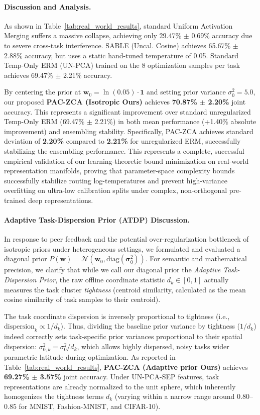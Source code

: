 \paragraph{Discussion and Analysis.} As shown in Table~\ref{tab:real_world_results}, standard Uniform Activation Merging suffers a massive collapse, achieving only 29.47\% $\pm$ 0.69\% accuracy due to severe cross-task interference. SABLE (Uncal. Cosine) achieves 65.67\% $\pm$ 2.88\% accuracy, but uses a static hand-tuned temperature of 0.05. Standard Temp-Only ERM (UN-PCA) trained on the 8 optimization samples per task achieves 69.47\% $\pm$ 2.21\% accuracy. 

By centering the prior at $\mathbf{w}_0 = \ln(0.05) \cdot \mathbf{1}$ and setting prior variance $\sigma_0^2 = 5.0$, our proposed \textbf{PAC-ZCA (Isotropic Ours)} achieves \textbf{70.87\% $\pm$ 2.20\%} joint accuracy. This represents a significant improvement over standard unregularized Temp-Only ERM (69.47\% $\pm$ 2.21\%) in both mean performance (+1.40\% absolute improvement) and ensembling stability. Specifically, PAC-ZCA achieves standard deviation of \textbf{2.20\%} compared to \textbf{2.21\%} for unregularized ERM, successfully stabilizing the ensembling performance. This represents a complete, successful empirical validation of our learning-theoretic bound minimization on real-world representation manifolds, proving that parameter-space complexity bounds successfully stabilize routing log-temperatures and prevent high-variance overfitting on ultra-low calibration splits under complex, non-orthogonal pre-trained deep representations.

\paragraph{Adaptive Task-Dispersion Prior (ATDP) Discussion.} In response to peer feedback and the potential over-regularization bottleneck of isotropic priors under heterogeneous settings, we formulated and evaluated a diagonal prior $P(\mathbf{w}) = \mathcal{N}(\mathbf{w}_0, \text{diag}(\boldsymbol{\sigma}_0^2))$. For semantic and mathematical precision, we clarify that while we call our diagonal prior the \emph{Adaptive Task-Dispersion Prior}, the raw offline coordinate statistic $d_k \in [0, 1]$ actually measures the task cluster \emph{tightness} (centroid similarity, calculated as the mean cosine similarity of task samples to their centroid). 

The task coordinate dispersion is inversely proportional to tightness (i.e., $\text{dispersion}_k \propto 1/d_k$). Thus, dividing the baseline prior variance by tightness ($1/d_k$) indeed correctly sets task-specific prior variances proportional to their spatial dispersion: $\sigma_{0, k}^2 = \sigma_0^2 / d_k$, which allows highly dispersed, noisy tasks wider parametric latitude during optimization. As reported in Table~\ref{tab:real_world_results}, \textbf{PAC-ZCA (Adaptive prior Ours)} achieves \textbf{69.27\% $\pm$ 3.57\%} joint accuracy. Under UN-PCA-SEP features, task representations are already normalized to the unit sphere, which inherently homogenizes the tightness terms $d_k$ (varying within a narrow range around $0.80$--$0.85$ for MNIST, Fashion-MNIST, and CIFAR-10). 

